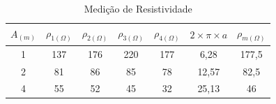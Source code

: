 \begin{table}[htbp]
  \centering

    \begin{tabular}{ccccccc}
    \toprule
    \textbf{$A_{(m)}$} & \textbf{$\rho_{1(\Omega)}$} & \textbf{$\rho_{2(\Omega)}$} & \textbf{$\rho_{3(\Omega)}$} & \textbf{$\rho_{4(\Omega)}$} & \textbf{$2\times\pi\times a$} &\textbf{$\rho_{m(\Omega)}$}\\
    \midrule
    1     & 137 & 176  & 220   &  177    & 6,28 & 177,5\\ 
    2     & 81 & 86   & 85   &    78   & 12,57 & 82,5\\
    4     & 55 & 52   & 45  & 32   & 25,13 & 46\\
    \bottomrule
    \end{tabular}%
  \caption{Medição de Resistividade}
\end{table}


